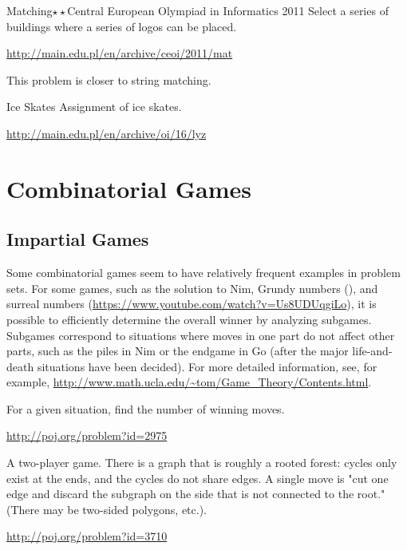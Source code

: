 \begin{pbox}{Matching$\star\star$}{Central European Olympiad in Informatics 2011}
Select a series of buildings where a series of logos can be placed.

\url{http://main.edu.pl/en/archive/ceoi/2011/mat}
\end{pbox}

This problem is closer to string matching.

\begin{pbox}{Ice Skates}{}
Assignment of ice skates.

\url{http://main.edu.pl/en/archive/oi/16/lyz}
\end{pbox}
\chapter{Combinatorial Games}

\section{Impartial Games}

Some combinatorial games seem to have relatively frequent examples in problem sets. For some games, such as the solution to Nim, Grundy numbers (\pccbook[pp.~272--]), and surreal numbers (\url{https://www.youtube.com/watch?v=Us8UDUqgiLo}), it is possible to efficiently determine the overall winner by analyzing subgames. Subgames correspond to situations where moves in one part do not affect other parts, such as the piles in Nim or the endgame in Go (after the major life-and-death situations have been decided). For more detailed information, see, for example, \url{http://www.math.ucla.edu/~tom/Game_Theory/Contents.html}.

\begin{psbox}
For a given situation, find the number of winning moves.
  
\url{http://poj.org/problem?id=2975}
\end{psbox}

\begin{pbox}

A two-player game. There is a graph that is roughly a rooted forest: cycles only exist at the ends, and the cycles do not share edges. A single move is "cut one edge and discard the subgraph on the side that is not connected to the root." (There may be two-sided polygons, etc.).

\url{http://poj.org/problem?id=3710} 
\end{pbox}

